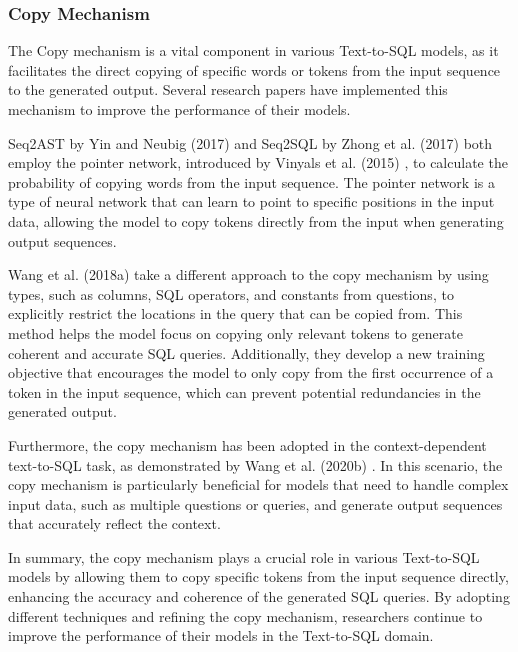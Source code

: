 \subsubsection{Copy Mechanism}

The Copy mechanism is a vital component in various Text-to-SQL models, as it facilitates the direct copying of specific words or tokens from the input sequence to the generated output. Several research papers have implemented this mechanism to improve the performance of their models.

Seq2AST by Yin and Neubig (2017) \cite{yin-neubig-2017-syntactic} and Seq2SQL by Zhong et al. (2017) \cite{zhong_seq2sql_2017} both employ the pointer network, introduced by Vinyals et al. (2015) \cite{vinyals2017pointer}, to calculate the probability of copying words from the input sequence. The pointer network is a type of neural network that can learn to point to specific positions in the input data, allowing the model to copy tokens directly from the input when generating output sequences.

Wang et al. (2018a) \cite{wang2017pointing} take a different approach to the copy mechanism by using types, such as columns, SQL operators, and constants from questions, to explicitly restrict the locations in the query that can be copied from. This method helps the model focus on copying only relevant tokens to generate coherent and accurate SQL queries. Additionally, they develop a new training objective that encourages the model to only copy from the first occurrence of a token in the input sequence, which can prevent potential redundancies in the generated output.

Furthermore, the copy mechanism has been adopted in the context-dependent text-to-SQL task, as demonstrated by Wang et al. (2020b) \cite{wang-etal-2020-pg}. In this scenario, the copy mechanism is particularly beneficial for models that need to handle complex input data, such as multiple questions or queries, and generate output sequences that accurately reflect the context.

In summary, the copy mechanism plays a crucial role in various Text-to-SQL models by allowing them to copy specific tokens from the input sequence directly, enhancing the accuracy and coherence of the generated SQL queries. By adopting different techniques and refining the copy mechanism, researchers continue to improve the performance of their models in the Text-to-SQL domain.